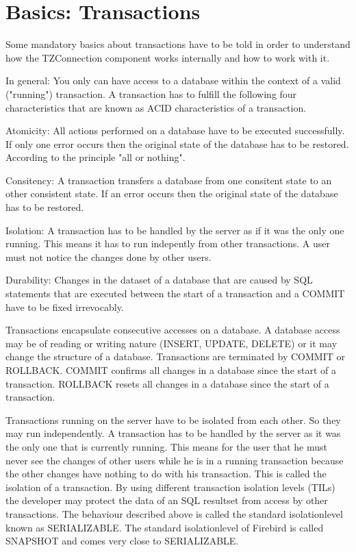 \documentclass[a4paper,12pt,oneside]{book}
\begin{document}
\chapter{Basics: Transactions}
Some mandatory basics about transactions have to be told in order to understand how the TZConnection
component works internally and how to work with it.

In general: You only can have access to a database within the context of a valid ("running") transaction.
A transaction has to fulfill the following four characteristics that are known as ACID characteristics of a transaction.

Atomicity: All actions performed on a database have to be executed successfully.
If only one error occurs then the original state of the database has to be restored.
According to the principle "all or nothing".

Consitency: A transaction transfers a database from one consitent state to an other consistent state.
If an error occurs then the original state of the database has to be restored.

Isolation: A transaction has to be handled by the server as if it was the only one running.
This means it has to run indepently from other transactions.
A user must not notice the changes done by other users.

Durability: Changes in the dataset of a database that are caused by SQL statements that are executed between the start of a transaction and a COMMIT have to be fixed irrevocably.

Transactions encapsulate consecutive accesses on a database.
A database access may be of reading or writing nature (INSERT, UPDATE, DELETE) or it may change the structure of a database.
Transactions are terminated by COMMIT or ROLLBACK.
COMMIT confirms all changes in a database since the start of a transaction.
ROLLBACK resets all changes in a database since the start of a transaction.

Transactions running on the server have to be isolated from each other.
So they may run independently.
A transaction has to be handled by the server as it was the only one that is currently running.
This means for the user that he must never see the changes of other users while he is in a running transaction because the other changes have nothing to do with his transaction.
This is called the isolation of a transaction.
By using different transaction isolation levels (TILs) the developer may protect the data of an SQL resultset from access by other transactions.
The behaviour described above is called the standard isolationlevel known as SERIALIZABLE.
The standard isolationlevel of Firebird is called SNAPSHOT and comes very close to SERIALIZABLE.
\end{document}

